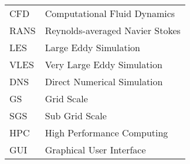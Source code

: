 \begin{table}[h]
\begin{tabular}{ll}
CFD&Computational Fluid Dynamics\\
RANS&Reynolds-averaged Navier Stokes\\
LES&Large Eddy Simulation\\
VLES&Very Large Eddy Simulation\\
DNS&Direct Numerical Simulation\\
GS&Grid Scale\\
SGS&Sub Grid Scale\\
HPC&High Performance Computing\\
GUI&Graphical User Interface\\
\end{tabular}
\end{table}